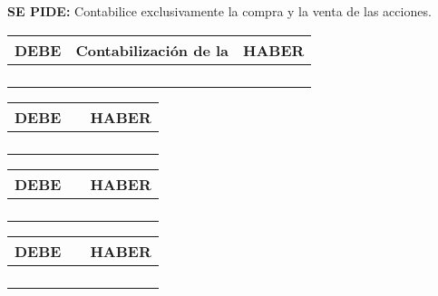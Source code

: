 \textbf{SE PIDE:} Contabilice exclusivamente la compra y la venta de las acciones.


\begin{table}[H]
    \centering
    \begin{tabular}{|p{3cm}|p{6cm}|p{3cm}|}
    \hline
    \rowcolor{blue!30}
    \textbf{DEBE} & \textbf{Contabilización de la } & \textbf{HABER} \\
    \hline
    &  & \\
    \hline
    &  & \\
    \hline
    &  & \\
    \hline
    &  & \\
    \hline
    \end{tabular}
\end{table}

\begin{table}[H]
    \centering
    \begin{tabular}{|p{3cm}|p{6cm}|p{3cm}|}
    \hline
    \rowcolor{blue!30}
    \textbf{DEBE} & \textbf{} & \textbf{HABER} \\
    \hline
    &  & \\
    \hline
    &  & \\
    \hline
    &  & \\
    \hline
    &  & \\
    \hline
    \end{tabular}
\end{table}

\begin{table}[H]
    \centering
    \begin{tabular}{|p{3cm}|p{6cm}|p{3cm}|}
    \hline
    \rowcolor{blue!30}
    \textbf{DEBE} & \textbf{} & \textbf{HABER} \\
    \hline
    &  & \\
    \hline
    &  & \\
    \hline
    &  & \\
    \hline
    &  & \\
    \hline
    \end{tabular}
\end{table}

\begin{table}[H]
    \centering
    \begin{tabular}{|p{3cm}|p{6cm}|p{3cm}|}
    \hline
    \rowcolor{blue!30}
    \textbf{DEBE} & \textbf{} & \textbf{HABER} \\
    \hline
    &  & \\
    \hline
    &  & \\
    \hline
    &  & \\
    \hline
    &  & \\
    \hline
    \end{tabular}
\end{table}


